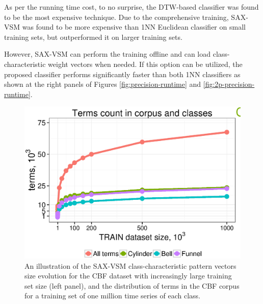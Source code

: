 As per the running time cost, to no surprise, the DTW-based classifier was found to be the most expensive technique. 
Due to the comprehensive training, SAX-VSM was found to be more expensive than 1NN Euclidean 
classifier on small training sets, but outperformed it on larger training sets.

However, SAX-VSM can perform the training offline and can load class-characteristic \tfidf weight vectors when needed. 
If this option can be utilized, the proposed classifier performs significantly faster than both 1NN classifiers as 
shown at the right panels of Figures \ref{fig:precision-runtime} and \ref{fig:2p-precision-runtime}.

\begin{figure}[t]
   \centering
   \includegraphics[width=140mm]{figures/words-cbf.ps}
   \caption[An illustration of the SAX-VSM class-characteristic pattern vectors size evolution for the CBF dataset 
   with increasingly large training set size.]{An illustration of the SAX-VSM class-characteristic pattern vectors
   size evolution for the CBF dataset 
   with increasingly large training set size (left panel), and the distribution of terms in the CBF corpus for 
   a training set of one million time series of each class.}
   \label{fig:venn-cbf}


\end{figure}
